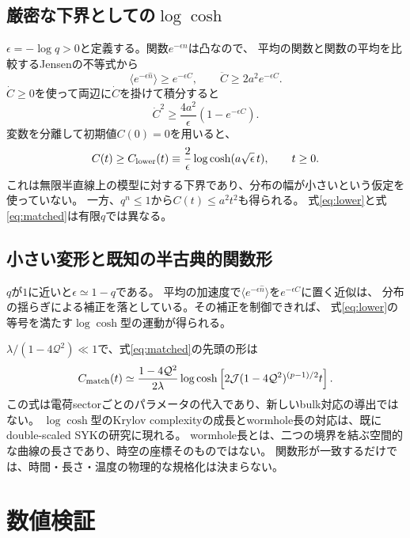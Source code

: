 \documentclass[a4paper,11pt]{ltjsarticle}
\numberwithin{equation}{section}
\newcommand{\avg}[1]{\langle #1\rangle}
\begin{document}
\subsection{厳密な下界としての$\log\cosh$}
$\epsilon=-\log q>0$と定義する。関数$e^{-\epsilon n}$は凸なので、
平均の関数と関数の平均を比較するJensenの不等式から
\begin{equation}
 \avg{e^{-\epsilon\hat n}}\geq e^{-\epsilon C},\qquad
 \ddot C\geq2a^2e^{-\epsilon C}.
 \label{eq:jensen}
\end{equation}
$\dot C\geq0$を使って両辺に$\dot C$を掛けて積分すると
\begin{equation}
 \dot C^2\geq\frac{4a^2}{\epsilon}(1-e^{-\epsilon C}).
 \label{eq:energybound}
\end{equation}
変数を分離して初期値$C(0)=0$を用いると、
\begin{equation}
 C(t)\geq C_{\rm lower}(t)
 \equiv\frac{2}{\epsilon}\log\cosh(a\sqrt\epsilon\,t),\qquad t\geq0.
 \label{eq:lower}
\end{equation}
これは無限半直線上の模型に対する下界であり、分布の幅が小さいという仮定を使っていない。
一方、$q^n\leq1$から$C(t)\leq a^2t^2$も得られる。
式\eqref{eq:lower}と式\eqref{eq:matched}は有限$q$では異なる。

\subsection{小さい変形と既知の半古典的関数形}
$q$が$1$に近いと$\epsilon\simeq1-q$である。
平均の加速度で$\avg{e^{-\epsilon\hat n}}$を$e^{-\epsilon C}$に置く近似は、
分布の揺らぎによる補正を落としている。その補正を制御できれば、
式\eqref{eq:lower}の等号を満たす$\log\cosh$型の運動が得られる。

$\lambda/(1-4\mathcal Q^2)\ll1$で、式\eqref{eq:matched}の先頭の形は
\begin{equation}
 C_{\rm match}(t)\simeq
 \frac{1-4\mathcal Q^2}{2\lambda}
 \log\cosh\left[2\mathcal J(1-4\mathcal Q^2)^{(p-1)/2}t\right].
 \label{eq:chargedapprox}
\end{equation}
この式は電荷sectorごとのパラメータの代入であり、新しいbulk対応の導出ではない。
$\log\cosh$型のKrylov complexityの成長とwormhole長の対応は、既にdouble-scaled SYKの研究に現れる\cite{Ambrosini}。
wormhole長とは、二つの境界を結ぶ空間的な曲線の長さであり、時空の座標そのものではない。
関数形が一致するだけでは、時間・長さ・温度の物理的な規格化は決まらない。

\section{数値検証}
\end{document}
